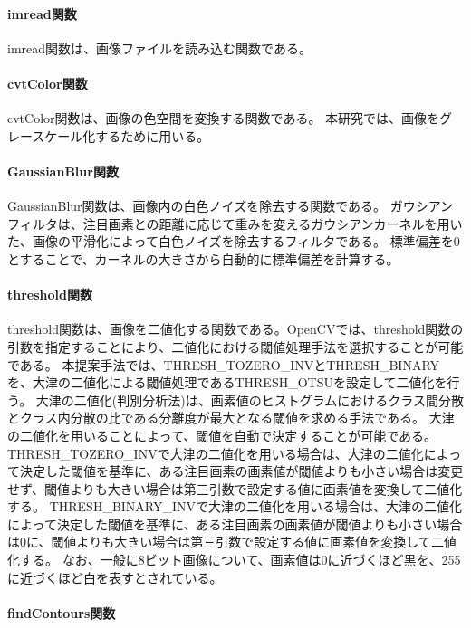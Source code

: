 \paragraph{imread関数}
imread関数は、画像ファイルを読み込む関数である。

\paragraph{cvtColor関数}
cvtColor関数は、画像の色空間を変換する関数である。
本研究では、画像をグレースケール化するために用いる。

\paragraph{GaussianBlur関数}
GaussianBlur関数は、画像内の白色ノイズを除去する関数である。
ガウシアンフィルタは、注目画素との距離に応じて重みを変えるガウシアンカーネルを用いた、画像の平滑化によって白色ノイズを除去するフィルタである。
標準偏差を0とすることで、カーネルの大きさから自動的に標準偏差を計算する\cite{ガウシアンフィルタ}。

\paragraph{threshold関数}
threshold関数は、画像を二値化する関数である。OpenCVでは、threshold関数の引数を指定することにより、二値化における閾値処理手法を選択することが可能である。
本提案手法では、THRESH\_TOZERO\_INVとTHRESH\_BINARYを、大津の二値化による閾値処理であるTHRESH\_OTSUを設定して二値化を行う。
大津の二値化(判別分析法)は、画素値のヒストグラムにおけるクラス間分散とクラス内分散の比である分離度が最大となる閾値を求める手法である\cite{大津の二値化}。
大津の二値化を用いることによって、閾値を自動で決定することが可能である。
THRESH\_TOZERO\_INVで大津の二値化を用いる場合は、大津の二値化によって決定した閾値を基準に、ある注目画素の画素値が閾値よりも小さい場合は変更せず、閾値よりも大きい場合は第三引数で設定する値に画素値を変換して二値化する。
THRESH\_BINARY\_INVで大津の二値化を用いる場合は、大津の二値化によって決定した閾値を基準に、ある注目画素の画素値が閾値よりも小さい場合は0に、閾値よりも大きい場合は第三引数で設定する値に画素値を変換して二値化する。
なお、一般に8ビット画像について、画素値は0に近づくほど黒を、255に近づくほど白を表すとされている\cite{画素値}。

\paragraph{findContours関数}

